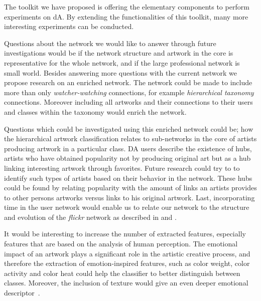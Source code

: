 The toolkit we have proposed is offering the elementary components to perform experiments on dA.
By extending the functionalities of this toolkit, many more interesting experiments can be conducted.

Questions about the network we would like to answer through future investigations would be if the network structure and artwork in the core is representative for the whole network, and if the large professional network is small world. 
Besides answering more questions with the current network we propose research on an enriched network. The network could be made to include more than only \textit{watcher-watching} connections, for example \textit{hierarchical taxonomy} connections. Moreover including all artworks  and their connections to their users and classes within the taxonomy would enrich the network.

Questions which could be investigated using this enriched network could be; how the hierarchical artwork classification relates to sub-networks in the core of artists producing artwork in a particular class.
DA users describe the existence of hubs, artists who have obtained popularity not by producing original art but as a  hub linking interesting artwork through favorites. Future research could try to  to identify such  types of artists based on their behavior in the network. These hubs could be found by relating popularity with the amount of links an artists provides to other persons artworks versus links to his original artwork.
Last, incorporating time in the user network would enable us to relate our network to the structure and evolution of the \textit{flickr} network as described in \cite{kumar2006structure} and  \cite{leskovec2008microscopic}.

It would be interesting to increase the number of extracted features, especially features that are based on the analysis of human perception.
The emotional impact of an artwork plays a significant role in the artistic creative process, and therefore the extraction of emotion-inspired features, such as color weight, color activity and color heat \cite{color_emotion1} could help the classifier to better distinguish between classes.
Moreover, the inclusion of texture would give an even deeper emotional descriptor~\cite{LucassenECCGIV2010}.

